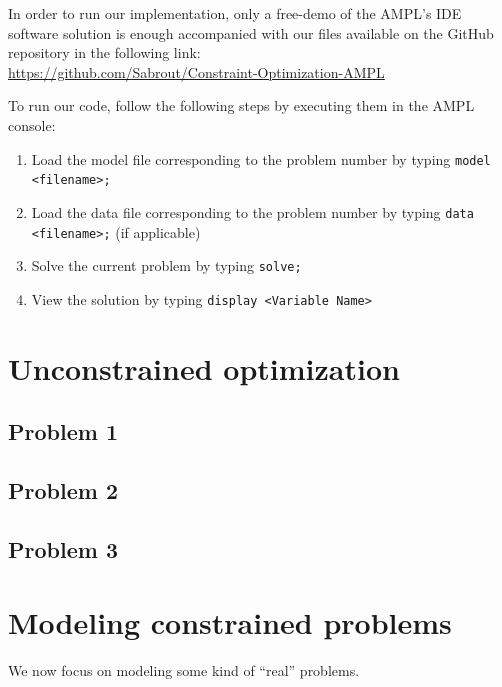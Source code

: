 In order to run our implementation, only a free-demo of the AMPL's IDE software solution is enough accompanied with our files available on the GitHub repository in the following link: \\
\url{https://github.com/Sabrout/Constraint-Optimization-AMPL}

To run our code, follow the following steps by executing them in the AMPL console:
\begin{enumerate}
	\item Load the model file corresponding to the problem number by typing \texttt{model <filename>;}
	\item Load the data file corresponding to the problem number by typing  \texttt{data <filename>;} (if applicable)
	\item Solve the current problem by typing \texttt{solve;}
	\item View the solution by typing \texttt{display <Variable Name>}
\end{enumerate}

\section{Unconstrained optimization}
\subsection{Problem 1}
\subsection{Problem 2}
\subsection{Problem 3}

\section{Modeling constrained problems}
We now focus on modeling some kind of “real” problems.
